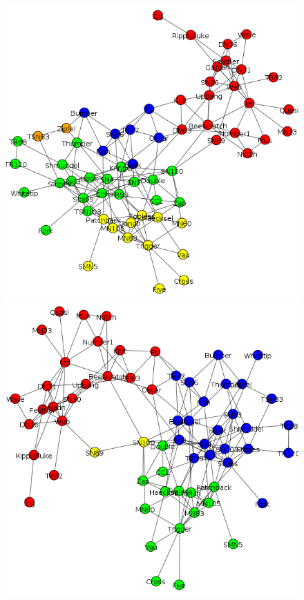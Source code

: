 \begin{figure}
\centering
\includegraphics[scale = 0.2]{graph_Edge_betweenness}
\includegraphics[scale = 0.2]{graph_Fast_greedy} \\

\end{figure}
